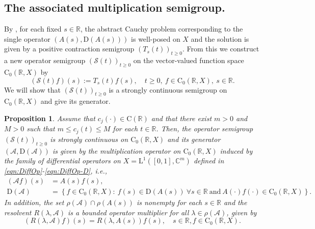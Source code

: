 \documentclass[a4paper,oneside,10pt]{amsart}
\newtheorem{proposition}[theorem]{Proposition}
\theoremstyle{definition}
\numberwithin{equation}{section}
\def\dom{\mathrm{D}}
\def\RR{\mathbb{R}}
\def\Ell{\mathrm{L}}
\begin{document}
\subsection{The associated multiplication semigroup.}

By \cite[Cor.~18.15]{BKR2017}, for each fixed $s\in\RR$, the abstract Cauchy problem corresponding to the single operator $(A(s),\dom(A(s)))$ is well-posed {on $X$} and the solution is given by a positive contraction semigroup $(T_s(t))_{t\geq0}$. From this we construct a new operator semigroup $(\mathcal{S}(t))_{t\geq0}$ on the vector-valued function space $\mathrm{C}_0(\RR,X)$ by 
\begin{equation}\label{eq:mult-sgr}
(\mathcal{S}(t)f)(s):=T_s(t)f(s),\quad t\geq0,\ f\in\mathrm{C}_0(\RR,X),\ s\in\RR.
\end{equation}
We will show that $(\mathcal{S}(t))_{t\geq0}$ is  a strongly continuous semigroup on  $\mathrm{C}_0(\RR,X)$ and give its generator.

\begin{proposition}\label{prop:MultiSemi}
Assume that $c_j(\cdot)\in\mathrm{C}(\RR)$ and that there exist {$m>0$ and $M>0$} such that $m\leq c_j(t)\leq M$ for each $t\in\RR$. Then, the operator semigroup $(\mathcal{S}(t))_{t\geq0}$ is strongly continuous on $\mathrm{C}_0(\RR,X)$ and its generator $(\mathcal{A},\dom(\mathcal{A}))$ is given by the multiplication operator on $\mathrm{C}_0(\RR,X)$ induced by the family of differential operators on {$X=\Ell^1\left(\left[0,1\right],\mathbb{C}^m\right)$} defined in \eqref{eqn:DiffOp}-\eqref{eqn:DiffOp-D}, i.e.,
\begin{align*}
(\mathcal{A}f)(s)&=A(s)f(s),\\
\dom(\mathcal{A})&=\left\{f\in\mathrm{C}_0(\RR,X): \  f(s)\in\dom(A(s)) \ { \forall s\in\RR \ \text{and} }  \ A(\cdot)f(\cdot)\in\mathrm{C}_0(\RR,X)\right\}.
\end{align*}
In addition, the set $\rho(\mathcal{A})\cap\rho(A(s))$ is nonempty for each $s\in\RR$ and the resolvent $R(\lambda,\mathcal{A})$ is a bounded operator multiplier for all $\lambda\in\rho(\mathcal{A})$, given by 
\[\left(R(\lambda,\mathcal{A})f\right)(s) = R(\lambda, A(s)) f(s),\quad s\in\RR, f\in\mathrm{C}_0(\RR,X).\]
\end{proposition}
\end{document}
